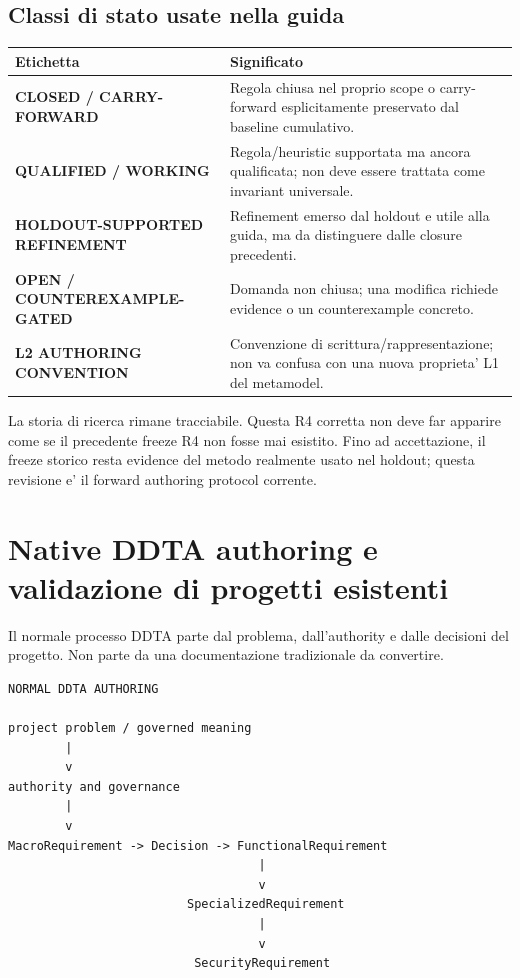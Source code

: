 \documentclass[11pt,a4paper]{article}
\begin{document}
\subsection{Classi di stato usate nella guida}

\begin{tabularx}{\textwidth}{L{52mm}Y}
\toprule
\textbf{Etichetta} & \textbf{Significato} \\
\midrule
{\sffamily\bfseries\color{DDTAGreen}CLOSED / CARRY-FORWARD} & Regola chiusa nel proprio scope o carry-forward esplicitamente preservato dal baseline cumulativo. \\
{\sffamily\bfseries\color{DDTAAmber}QUALIFIED / WORKING} & Regola/heuristic supportata ma ancora qualificata; non deve essere trattata come invariant universale. \\
{\sffamily\bfseries\color{DDTATeal}HOLDOUT-SUPPORTED REFINEMENT} & Refinement emerso dal holdout e utile alla guida, ma da distinguere dalle closure precedenti. \\
{\sffamily\bfseries\color{DDTARed}OPEN / COUNTEREXAMPLE-GATED} & Domanda non chiusa; una modifica richiede evidence o un counterexample concreto. \\
{\sffamily\bfseries\color{DDTABlue}L2 AUTHORING CONVENTION} & Convenzione di scrittura/rappresentazione; non va confusa con una nuova proprieta' L1 del metamodel. \\
\bottomrule
\end{tabularx}

\begin{ddtaprinciple}
La storia di ricerca rimane tracciabile. Questa R4 corretta non deve far apparire come se il precedente freeze R4 non fosse mai esistito. Fino ad accettazione, il freeze storico resta evidence del metodo realmente usato nel holdout; questa revisione e' il forward authoring protocol corrente.
\end{ddtaprinciple}

\section{Native DDTA authoring e validazione di progetti esistenti}

\closedtag\quad Il normale processo DDTA parte dal problema, dall'authority e dalle decisioni del progetto. Non parte da una documentazione tradizionale da convertire.

\begin{lstlisting}
NORMAL DDTA AUTHORING

project problem / governed meaning
        |
        v
authority and governance
        |
        v
MacroRequirement -> Decision -> FunctionalRequirement
                                   |
                                   v
                         SpecializedRequirement
                                   |
                                   v
                          SecurityRequirement
\end{lstlisting}
\end{document}
